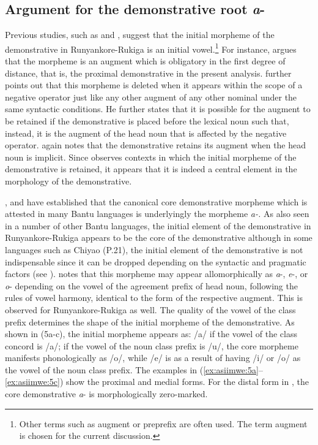 \documentclass[output=paper 		  ]{langscibook}
\begin{document}
\subsection{Argument for the demonstrative root \textit{a}-}
\label{sec:asiimwe:2.1}

Previous studies, such as \citet{MorrisKirwan1972} and \citet[137--138]{Taylor1985}, suggest that the initial morpheme of the demonstrative in Run\-yan\-ko\-re-Ru\-ki\-ga is an initial vowel.\footnote{Other terms such as augment or preprefix are often used. The term augment is chosen for the current discussion.} For instance, \citet[137]{Taylor1985} argues that the morpheme is an augment which is obligatory in the first degree of distance, that is, the proximal demonstrative in the present analysis. \citet{Taylor1985} further points out that this morpheme is deleted when it appears within the scope of a negative operator just like any other augment of any other nominal under the same syntactic conditions. He further states that it is possible for the augment to be retained if the demonstrative is placed before the lexical noun such that, instead, it is the augment of the head noun that is affected by the negative operator. \citet{Taylor1985} again notes that the demonstrative retains its augment when the head noun is implicit. Since \citet{Taylor1985} observes contexts in which the initial morpheme of the demonstrative is retained, it appears that it is indeed a central element in the morphology of the demonstrative.

\citet{Wald1973}, \citet{DuPlessisEtAl1978} and  \citet{DuPlessisEtAl1992} have established that the canonical core demonstrative morpheme which is attested in many Bantu languages is underlyingly the morpheme \textit{a-.} As also seen in a number of other Bantu languages, the initial element of the demonstrative in Run\-yan\-ko\-re-Ru\-ki\-ga appears to be the core of the demonstrative although in some languages such as Chiyao (P.21), the initial element of the demonstrative is not indispensable since it can be dropped depending on the syntactic and pragmatic factors (see ). \citet[28]{Visser2008} notes that this morpheme may appear allomorphically as \textit{a}{}-, \textit{e}{}-, or \textit{o}{}- depending on the vowel of the agreement prefix of head noun, following the rules of vowel harmony, identical to the form of the respective augment. This is observed for Run\-yan\-ko\-re-Ru\-ki\-ga as well. The quality of the vowel of the class prefix determines the shape of the initial morpheme of the demonstrative. As shown in (5a-c), the initial morpheme appears as: /a/ if the vowel of the class concord is /a/; if the vowel of the noun class prefix is /u/, the core morpheme manifests phonologically as /o/, while /e/ is as a result of having /i/ or /o/ as the vowel of the noun class prefix. The examples in (\ref{ex:asiimwe:5a}--\ref{ex:asiimwe:5c}) show the proximal and medial forms. For the distal form in , the core demonstrative \textit{a}{}- is morphologically zero-marked.\largerpage
\end{document}
